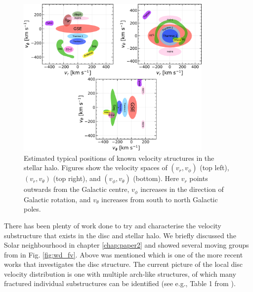 \begin{figure}[t]
    \centering
    \includegraphics[width=0.85\textwidth]{images/map_only_b.pdf}
    \caption{Estimated typical positions of known velocity structures in the stellar halo. Figures show the velocity spaces of $(v_r, v_\phi)$ (top left), $(v_r, v_\theta)$ (top right), and $(v_\phi, v_\theta)$ (bottom). Here $v_r$ points outwards from the Galactic centre, $v_\phi$ increases in the direction of Galactic rotation, and $v_\theta$ increases from south to north Galactic poles.} %
    \label{fig:halo_map}
\end{figure}
There has been plenty of work done to try and characterise the velocity substructure that exists in the disc and stellar halo. We briefly discussed the Solar neighbourhood in chapter \ref{chap:paper2} and showed several moving groups from \cite{antoja:12} in Fig. \ref{fig:wd_fv}. Above \cite{lucchini:22} was mentioned which is one of the more recent works that investigates the disc structure. The current picture of the local disc velocity distribution is one with multiple arch-like structures, of which many fractured individual substructures can be identified (see e.g., Table 1 from \citealt{lucchini:22}). 

